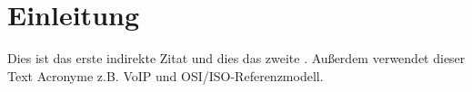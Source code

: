 \section*{Einleitung}

\lipsum[3]
Dies ist das erste indirekte Zitat \cite{von_wagner_ip-umstellung:_2015} und dies das zweite \cite{goldberg_architectural_1973}.
\lipsum[3]
Außerdem verwendet dieser Text Acronyme z.B. \acrshort{VoIP} und \gls{OSI/ISO-Referenzmodell}.
